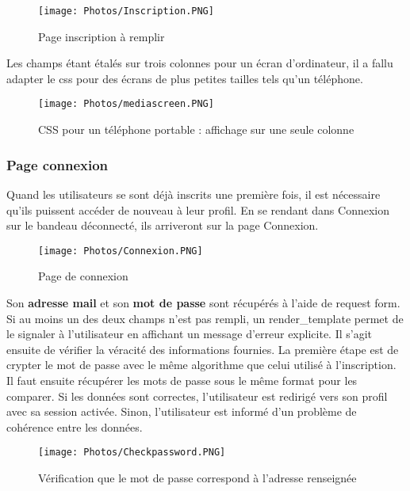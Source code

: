 \documentclass{article}
\begin{document}
\begin{figure}[h!]
    \centering
    \texttt{[image: Photos/Inscription.PNG]}
    \caption{Page inscription à remplir}
    \label{fig:my_label}
\end{figure}

 Les champs étant étalés sur trois colonnes pour un écran d'ordinateur, il a fallu adapter le css pour des écrans de plus petites tailles tels qu'un téléphone.
\begin{figure}[h!]
    \centering
    \texttt{[image: Photos/mediascreen.PNG]}
    \caption{CSS pour un téléphone portable : affichage sur une seule colonne}
    \label{fig:my_label}
\end{figure}
\vspace{5cm}
\newline 
\subsubsection{Page connexion}
Quand les utilisateurs se sont déjà inscrits une première fois, il est nécessaire qu'ils puissent accéder de nouveau à leur profil. En se rendant dans Connexion sur le bandeau déconnecté, ils arriveront sur la page Connexion.
\begin{figure}[h!]
    \centering
    \texttt{[image: Photos/Connexion.PNG]}
    \caption{Page de connexion}
    \label{fig:my_label}
\end{figure} 
\vspace{1cm}
\newline Son \textbf{adresse mail} et son \textbf{mot de passe} sont récupérés à l'aide de request form. Si au moins un des deux champs n'est pas rempli, un render\_template permet de le signaler à l'utilisateur en affichant un message d'erreur explicite. Il s'agit ensuite de vérifier la véracité des informations fournies. La première étape est de crypter le mot de passe avec le même algorithme que celui utilisé à l'inscription. Il faut ensuite récupérer les mots de passe sous le même format pour les comparer. Si les données sont correctes, l'utilisateur est redirigé vers son profil avec sa session activée. Sinon, l'utilisateur est informé d'un problème de cohérence entre les données.
\begin{figure}[h!]
    \centering
    \texttt{[image: Photos/Checkpassword.PNG]}
    \caption{Vérification que le mot de passe correspond à l'adresse renseignée}
    \label{fig:my_label}
\end{figure}
\vspace{5cm}
\end{document}
